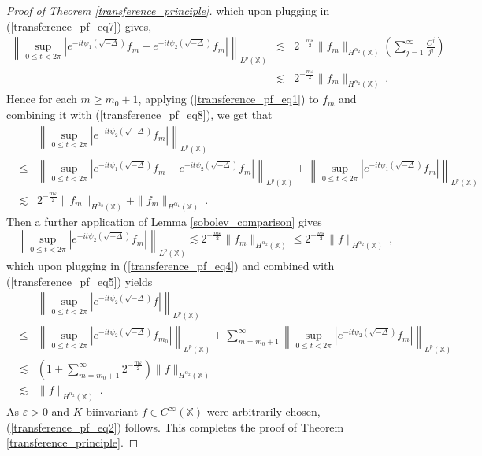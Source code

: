 \documentclass[12pt]{amsart}
\theoremstyle{definition}
\newcommand{\X}{\mathbb X}%
\numberwithin{equation}{section}
\begin{document}
\begin{proof}[Proof of Theorem \ref{transference_principle}]
which upon plugging in (\ref{transference_pf_eq7}) gives,
\begin{eqnarray} \label{transference_pf_eq8}
\left\|\sup_{0\le t<2\pi}\left|e^{-it\psi_1\left(\sqrt{-\Delta}\right)} f_m   - e^{-it\psi_2\left(\sqrt{-\Delta}\right)} f_m \right|\right\|_{L^p(\X)} &\lesssim & 2^{-\frac{m\varepsilon}{2}} \|f_m\|_{H^{\alpha_2}(\X)}\left(\sum_{j=1}^\infty \frac{C^j}{j!}\right)\nonumber\\
& \lesssim &  2^{-\frac{m\varepsilon}{2}} \|f_m\|_{H^{\alpha_2}(\X)}\:.
\end{eqnarray}
Hence for each $m \ge m_0+1$, applying (\ref{transference_pf_eq1}) to $f_m$ and combining it with (\ref{transference_pf_eq8}), we get that
\begin{eqnarray*}
&&\left\|\sup_{0 \le t < 2\pi} \left|e^{-it\psi_2\left(\sqrt{-\Delta}\right)} f_m \right|\right\|_{L^p(\X)} \\
&\le & \left\|\sup_{0\le t<2\pi}\left|e^{-it\psi_1\left(\sqrt{-\Delta}\right)} f_m   - e^{-it\psi_2\left(\sqrt{-\Delta}\right)} f_m \right|\right\|_{L^p(\X)} + \left\|\sup_{0 \le t < 2\pi} \left|e^{-it\psi_1\left(\sqrt{-\Delta}\right)} f_m \right|\right\|_{L^p(\X)} \\
& \lesssim &  2^{-\frac{m\varepsilon}{2}} \|f_m\|_{H^{\alpha_2}(\X)} + \|f_m\|_{H^{\alpha_1}(\X)}\:.
\end{eqnarray*}
Then a further application of Lemma \ref{sobolev_comparison} gives
\begin{equation*}
\left\|\sup_{0 \le t < 2\pi} \left|e^{-it\psi_2\left(\sqrt{-\Delta}\right)} f_m \right|\right\|_{L^p(\X)} \lesssim 2^{-\frac{m\varepsilon}{2}} \|f_m\|_{H^{\alpha_2}(\X)} \le 2^{-\frac{m\varepsilon}{2}} \|f\|_{H^{\alpha_2}(\X)}\:,
\end{equation*}
which upon plugging in (\ref{transference_pf_eq4}) and combined with (\ref{transference_pf_eq5}) yields
\begin{eqnarray*}
&&\left\|\sup_{0 \le t < 2\pi} \left|e^{-it\psi_2\left(\sqrt{-\Delta}\right)} f \right|\right\|_{L^p(\X)}\\
 & \le & \left\|\sup_{0 \le t < 2\pi} \left|e^{-it\psi_2\left(\sqrt{-\Delta}\right)} f_{m_0} \right|\right\|_{L^p(\X)} + \sum_{m=m_0+1}^\infty \left\|\sup_{0 \le t < 2\pi} \left|e^{-it\psi_2\left(\sqrt{-\Delta}\right)} f_m \right|\right\|_{L^p(\X)} \\
&\lesssim & \left(1+\sum_{m=m_0+1}^\infty 2^{-\frac{m\varepsilon}{2}} \right)  \|f\|_{H^{\alpha_2}(\X)} \\
&\lesssim &  \|f\|_{H^{\alpha_2}(\X)}\:.
\end{eqnarray*}
As $\varepsilon>0$ and $K$-biinvariant $f \in C^\infty(\X)$ were arbitrarily chosen, (\ref{transference_pf_eq2}) follows. This completes the proof of Theorem \ref{transference_principle}.
\end{proof}
\end{document}

